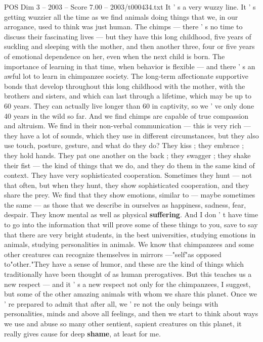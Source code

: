 \begin{textsample}{POS Dim 3 – 2003 – Score 7.00 – 2003/t000434.txt}
It ' s a very wuzzy line.
It ' s getting wuzzier all the time as we find animals doing things that we, in our arrogance, used to think was just human.
The chimps — there ' s no time to discuss their fascinating lives — but they have this long childhood, five years of suckling and sleeping with the mother, and then another three, four or five years of emotional dependence on her, even when the next child is born.
The importance of learning in that time, when behavior is flexible — and there ' s an awful lot to learn in chimpanzee society.
The long-term affectionate supportive bonds that develop throughout this long childhood with the mother, with the brothers and sisters, and which can last through a lifetime, which may be up to 60 years.
They can actually live longer than 60 in captivity, so we ' ve only done 40 years in the wild so far.
And we find chimps are capable of true compassion and altruism.
We find in their non-verbal communication — this is very rich — they have a lot of sounds, which they use in different circumstances, but they also use touch, posture, gesture, and what do they do?
They kiss ; they embrace ; they hold hands.
They pat one another on the back ; they swagger ; they shake their fist — the kind of things that we do, and they do them in the same kind of context.
They have very sophisticated cooperation.
Sometimes they hunt — not that often, but when they hunt, they show sophisticated cooperation, and they share the prey.
We find that they show emotions, similar to — maybe sometimes the same — as those that we describe in ourselves as happiness, sadness, fear, despair.
They know mental as well as physical \textbf{suffering}.
And I don ' t have time to go into the information that will prove some of these things to you, save to say that there are very bright students, in the best universities, studying emotions in animals, studying personalities in animals.
We know that chimpanzees and some other creatures can recognize themselves in mirrors —"self"as opposed to"other."They have a sense of humor, and these are the kind of things which traditionally have been thought of as human prerogatives.
But this teaches us a new respect — and it ' s a new respect not only for the chimpanzees, I suggest, but some of the other amazing animals with whom we share this planet.
Once we ' re prepared to admit that after all, we ' re not the only beings with personalities, minds and above all feelings, and then we start to think about ways we use and abuse so many other sentient, sapient creatures on this planet, it really gives cause for deep \textbf{shame}, at least for me.

\end{textsample}
